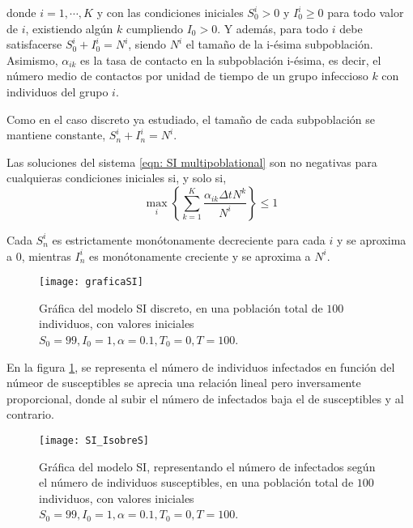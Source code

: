 donde $i=1, \cdots , K$ y con las condiciones iniciales $S_0^i > 0$ y $I_0^i\geq 0$ para todo valor de $i$, existiendo algún $k$ cumpliendo $I_0>0$. Y además, para todo $i$ debe satisfacerse $S_0^i+I_0^i=N^i$, siendo $N^i$ el tamaño de la i-ésima subpoblación. Asimismo, $\alpha_{ik}$ es la tasa de contacto en la subpoblación i-ésima, es decir, el número medio de contactos por unidad de tiempo de un grupo infeccioso $k$ con individuos del grupo $i$.

Como en el caso discreto ya estudiado, el tamaño de cada subpoblación se mantiene constante, $S_n^i+I_n^i=N^i$.

\begin{proposition}
Las soluciones del sistema \eqref{eqn: SI multipoblational} son no negativas para cualquieras condiciones iniciales si, y solo si,
$$\max_i \left\{ \sum_{k=1}^{K} \frac{\alpha_{ik}\Delta t N^k}{N^i} \right\} \leq 1$$
\end{proposition}

\begin{proposition}
Cada $S_n^i$ es estrictamente monótonamente decreciente para cada $i$ y se aproxima a $0$, mientras $I_n^i$ es monótonamente creciente y se aproxima a $N^i$. 
\end{proposition}

\begin{figure}
\begin{center}
\caption{Gráfica del modelo SI discreto, en una población total de $100$ individuos, con valores iniciales $S_0=99, I_0 = 1, \alpha = 0.1, T_0 = 0, T = 100$.}
\texttt{[image: graficaSI]}
\end{center}
\end{figure}

En la figura \ref{fig: SI_IsobreS}, se representa el número de individuos infectados en función del númeor de susceptibles se aprecia una relación lineal pero inversamente proporcional, donde al subir el número de infectados baja el de susceptibles y al contrario.

\begin{figure}
\begin{center}
\caption{Gráfica del modelo SI, representando el número de infectados según el número de individuos susceptibles, en una población total de $100$ individuos, con valores iniciales $S_0=99, I_0 = 1, \alpha = 0.1, T_0 = 0, T = 100$.}
\label{fig: SI_IsobreS}
\texttt{[image: SI\_IsobreS]}
\end{center}
\end{figure}

